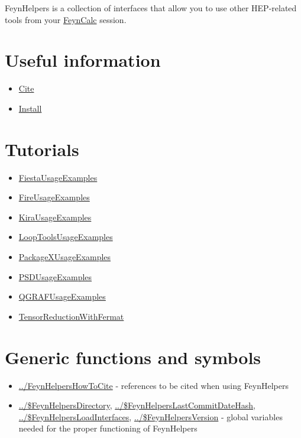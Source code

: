 \documentclass[../FeynHelpersManual.tex]{subfiles}
\begin{document}
FeynHelpers is a collection of interfaces that allow you to use other
HEP-related tools from your \href{https://feyncalc.github.io}{FeynCalc}
session.

\hypertarget{useful information}{
\section{Useful information}\label{useful information}}

\begin{itemize}
\tightlist
\item
  \hyperlink{cite}{Cite}
\item
  \hyperlink{install}{Install}
\end{itemize}

\hypertarget{tutorials}{
\section{Tutorials}\label{tutorials}}

\begin{itemize}
\tightlist
\item
  \hyperlink{fiestausageexamples}{FiestaUsageExamples}
\item
  \hyperlink{fireusageexamples}{FireUsageExamples}
\item
  \hyperlink{kirausageexamples}{KiraUsageExamples}
\item
  \hyperlink{looptoolsusageexamples}{LoopToolsUsageExamples}
\item
  \hyperlink{packagexusageexamples}{PackageXUsageExamples}
\item
  \hyperlink{psdusageexamples}{PSDUsageExamples}
\item
  \hyperlink{qgrafusageexamples}{QGRAFUsageExamples}
\item
  \hyperlink{tensorreductionwithfermat}{TensorReductionWithFermat}
\end{itemize}

\hypertarget{generic functions and symbols}{
\section{Generic functions and symbols}\label{generic functions and symbols}}

\begin{itemize}
\tightlist
\item
  \hyperlink{../feynhelpershowtocite}{../FeynHelpersHowToCite} -
  references to be cited when using FeynHelpers
\item
  \hyperlink{../dollarfeynhelpersdirectory}{../\$FeynHelpersDirectory},
  \hyperlink{../dollarfeynhelperslastcommitdatehash}{../\$FeynHelpersLastCommitDateHash},
  \hyperlink{../dollarfeynhelpersloadinterfaces}{../\$FeynHelpersLoadInterfaces},
  \hyperlink{../dollarfeynhelpersversion}{../\$FeynHelpersVersion} -
  global variables needed for the proper functioning of FeynHelpers
\end{itemize}
\end{document}
